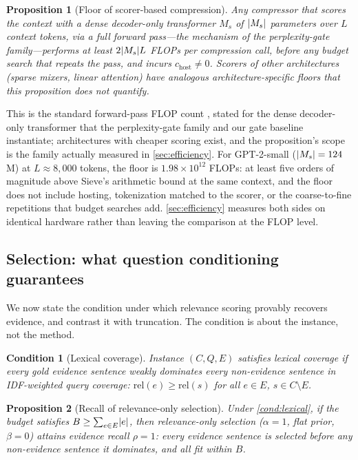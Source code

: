 \documentclass[preprint,12pt]{elsarticle}
\DeclarePairedDelimiter\abs{\lvert}{\rvert}
\newtheorem{proposition}{Proposition}
\newtheorem{condition}{Condition}
\theoremstyle{remark}
\newcommand{\method}{Sieve}
\begin{document}
\begin{proposition}[Floor of scorer-based compression]
\label{prop:floor}
Any compressor that scores the context with a dense decoder-only
transformer $M_s$ of $\abs{M_s}$ parameters over $L$ context tokens,
via a full forward pass---the mechanism of the perplexity-gate
family---performs at least $2\abs{M_s} L$ FLOPs per compression call,
before any budget search that repeats the pass, and incurs
$c_{\mathrm{host}} \ne 0$. Scorers of other architectures (sparse
mixers, linear attention) have analogous architecture-specific floors
that this proposition does not quantify.
\end{proposition}

This is the standard forward-pass FLOP count \citep{kaplan2020scaling},
stated for the dense decoder-only transformer that the perplexity-gate
family and our gate baseline instantiate; architectures with cheaper
scoring exist, and the proposition's scope is the family actually
measured in \autoref{sec:efficiency}.
For GPT-2-small ($\abs{M_s} = 124$M) at $L \approx 8{,}000$ tokens,
the floor is $1.98 \times 10^{12}$ FLOPs: at least five orders of
magnitude above \method{}'s arithmetic bound at the same context, and
the floor does not include hosting, tokenization matched to the
scorer, or the coarse-to-fine repetitions that budget searches add.
\autoref{sec:efficiency} measures both sides on identical hardware
rather than leaving the comparison at the FLOP level.

\subsection{Selection: what question conditioning guarantees}
\label{sec:guarantees}
We now state the condition under which relevance scoring provably
recovers evidence, and contrast it with truncation. The condition is
about the instance, not the method.

\begin{condition}[Lexical coverage]
\label{cond:lexical}
Instance $(C, Q, E)$ satisfies lexical coverage if every gold
evidence sentence weakly dominates every non-evidence sentence in
IDF-weighted query coverage:
$\mathrm{rel}(e) \ge \mathrm{rel}(s)$ for all $e \in E$,
$s \in C \setminus E$.
\end{condition}

\begin{proposition}[Recall of relevance-only selection]
\label{prop:relonly}
Under \autoref{cond:lexical}, if the budget satisfies
$B \ge \sum_{e \in E} \abs{e}$, then relevance-only selection
($\alpha=1$, flat prior, $\beta=0$) attains evidence recall $\rho=1$:
every evidence sentence is selected before any non-evidence sentence
it dominates, and all fit within $B$.
\end{proposition}
\end{document}
